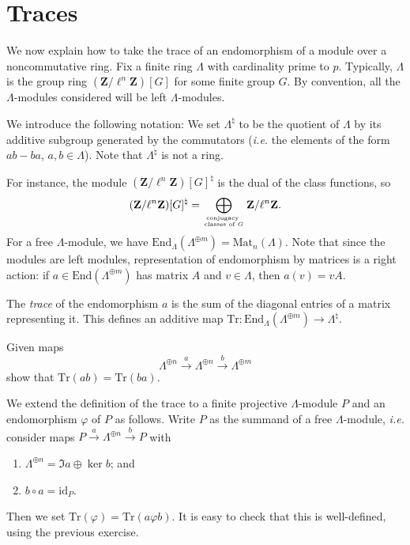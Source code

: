 \section{Traces}
\label{section-traces}

\noindent
We now explain how to take the trace of an endomorphism of a module over a
noncommutative ring. Fix a finite ring $\Lambda$ with cardinality prime to $p$.
Typically, $\Lambda$ is the group ring $(\mathbf{Z}/\ell^n\mathbf{Z})[G]$ for
some finite group $G$. By convention, all the $\Lambda$-modules considered will
be left $\Lambda$-modules.

\medskip\noindent
We introduce the following notation:
We set $\Lambda^\natural$ to be the quotient of $\Lambda$ by its additive
subgroup generated by the commutators ({\it i.e.} the elements of the form
$ab-ba$, $a, b \in \Lambda$). Note that $\Lambda^\natural$ is not a ring.

\medskip\noindent
For instance, the module $(\mathbf{Z}/\ell^n\mathbf{Z})[G]^\natural$ is the
dual of the class functions, so
$$
(\mathbf{Z}/\ell^n\mathbf{Z})[G]^\natural = \bigoplus_{\text{conjugacy } \atop
\text{classes of $G$}} \mathbf{Z}/\ell^n\mathbf{Z}.
$$
For a free $\Lambda$-module, we have $\text{End}_\Lambda(\Lambda^{\oplus m}) =
\text{Mat}_n(\Lambda)$. Note that since the modules are left modules,
representation of endomorphism by matrices is a right action: if $a \in
\text{End}(\Lambda^{\oplus m})$ has matrix $A$ and $v \in \Lambda$, then $a(v)
= v A$.

\begin{definition}
\label{definition-trace}
The {\it trace} of the endomorphism $a$ is the sum of the diagonal entries of
a matrix representing it. This defines an additive map $\text{Tr} :
\text{End}_\Lambda(\Lambda^{\oplus m}) \to \Lambda^\natural$.
\end{definition}

\begin{exercise}
\label{exercise-trace-is-trace}
Given maps
$$
\Lambda^{\oplus n} \xrightarrow{a}
\Lambda^{\oplus n} \xrightarrow{b}
\Lambda^{\oplus m}
$$
show that $\text{Tr}(ab) = \text{Tr}(ba)$.
\end{exercise}

\noindent
We extend the definition of the trace to a finite projective $\Lambda$-module
$P$ and an endomorphism $\varphi$ of $P$ as follows. Write $P$ as the summand
of a free $\Lambda$-module, {\it i.e.} consider maps $P \xrightarrow{a}
\Lambda^{\oplus n} \xrightarrow{b} P$ with
\begin{enumerate}
\item
$\Lambda^{\oplus n} = \Im a \oplus \ker b$; and
\item
$b\circ a = \text{id}_P$.
\end{enumerate}
Then we set $\text{Tr}(\varphi) = \text{Tr}(a\varphi b)$. It is easy to check
that this is well-defined, using the previous exercise.








